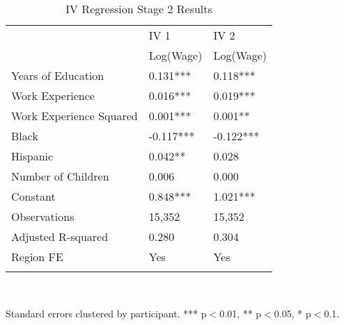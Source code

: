 \begin{table}[h] \centering
{}

\caption{IV Regression Stage 2 Results}
{\footnotesize
\begin{tabularx}{0.5\linewidth}{@{}lCC@{}}

\toprule
&IV 1&IV 2 \tabularnewline
&Log(Wage)&Log(Wage) \tabularnewline
\midrule Years of Education&0.131***&0.118*** \tabularnewline
Work Experience&0.016***&0.019*** \tabularnewline
Work Experience Squared&0.001***&0.001** \tabularnewline
Black&-0.117***&-0.122*** \tabularnewline
Hispanic&0.042**&0.028 \tabularnewline
Number of Children&0.006&0.000 \tabularnewline
\midrule Constant&0.848***&1.021*** \tabularnewline
Observations&15,352&15,352 \tabularnewline
Adjusted R-squared&0.280&0.304 \tabularnewline
Region FE&Yes&Yes \tabularnewline
\bottomrule \addlinespace[\belowrulesep]

\end{tabularx}
\\ \parbox{0.5\linewidth}{\footnotesize Standard errors clustered by participant. *** p$<$0.01, ** p$<$0.05, * p$<$0.1.}
}
\end{table}
